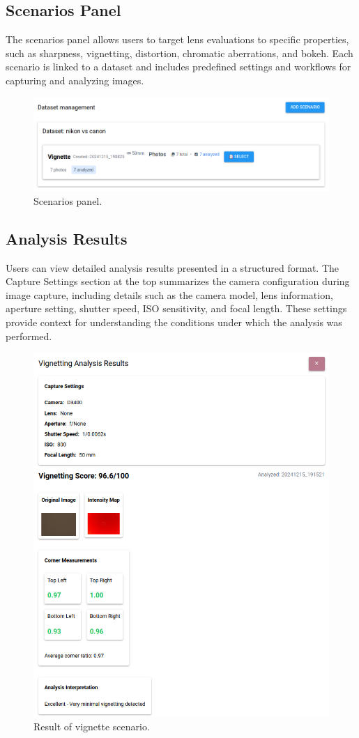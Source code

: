 \subsection{Scenarios Panel}

The scenarios panel allows users to target lens evaluations to specific properties, such as sharpness, vignetting, distortion, chromatic aberrations, and bokeh. Each scenario is linked to a dataset and includes predefined settings and workflows for capturing and analyzing images.

\begin{figure}[hbt]
\centering
\includegraphics[width=1\textwidth]{Images/scenarios_panel.png}
\caption{Scenarios panel.}
\label{fig:ui_scenarios}
\end{figure}

\subsection{Analysis Results}

Users can view detailed analysis results presented in a structured format. The Capture Settings section at the top summarizes the camera configuration during image capture, including details such as the camera model, lens information, aperture setting, shutter speed, ISO sensitivity, and focal length. These settings provide context for understanding the conditions under which the analysis was performed.

\begin{figure}[hbt]
\centering
\includegraphics[height=0.8\textwidth]{Images/scenario_result.png}
\caption{Result of vignette scenario.}
\label{fig:ui_scenario_result}
\end{figure}

